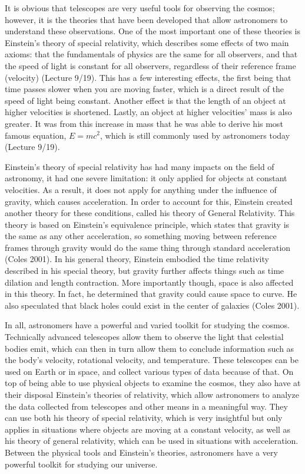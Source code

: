 \documentclass[14pt]{article}
\begin{document}
\vspace{5mm}
It is obvious that telescopes are very useful tools for observing the cosmos;
however, it is the theories that have been developed that allow astronomers to
understand these observations.  One of the most important one of these theories
is Einstein's theory of special relativity, which describes some effects of two
main axioms: that the fundamentals of physics are the same for all observers,
and that the speed of light is constant for all observers, regardless of their
reference frame (velocity) (Lecture 9/19).  This has a few interesting effects,
the first being that time passes slower when you are moving faster, which is a
direct result of the speed of light being constant.  Another effect is that the
length of an object at higher velocities is shortened.  Lastly, an object at
higher velocities' mass is also greater.  It was from this increase in mass that
he was able to derive his most famous equation, $E=mc^2$, which is still
commonly used by astronomers today (Lecture 9/19).

\vspace{5mm}
Einstein's theory of special relativity has had many impacts on the field of
astronomy, it had one severe limitation: it only applied for objects at constant
velocities.  As a result, it does not apply for anything under the influence of
gravity, which causes acceleration.  In order to account for this, Einstein
created another theory for these conditions, called his theory of General
Relativity.  This theory is based on Einstein's equivalence principle, which
states that gravity is the same as any other acceleration, so something moving
between reference frames through gravity would do the same thing through
standard acceleration (Coles 2001).  In his general theory, Einstein embodied
the time relativity described in his special theory, but gravity further affects
things such as time dilation and length contraction.  More importantly though,
space is also affected in this theory.  In fact, he determined that gravity
could cause space to curve.  He also speculated that black holes could exist in
the center of galaxies (Coles 2001).

\vspace{5mm}
In all, astronomers have a powerful and varied toolkit for studying the cosmos.
Technically advanced telescopes allow them to observe the light that celestial
bodies emit, which can then in turn allow them to conclude information such as
the body's velocity, rotational velocity, and temperature.  These telescopes can
be used on Earth or in space, and collect various types of data because of that.
On top of being able to use physical objects to examine the cosmos, they also
have at their disposal Einstein's theories of relativity, which allow
astronomers to analyze the data collected from telescopes and other means in a
meaningful way.  They can use both his theory of special relativity, which is
very insightful but only applies in situations where objects are moving at a
constant velocity, as well as his theory of general relativity, which can be
used in situations with acceleration.  Between the physical tools and Einstein's
theories, astronomers have a very powerful toolkit for studying our universe.
\end{document}
